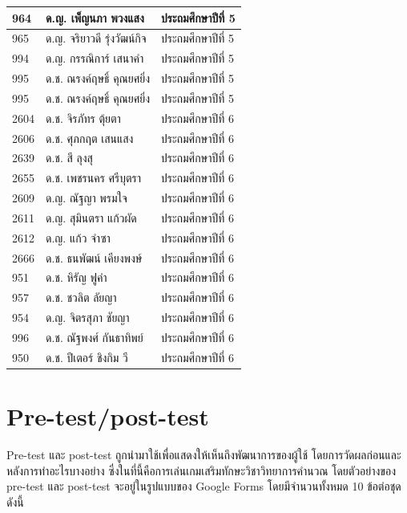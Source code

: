 \begin{center}
\begin{tabular}{ |p{3cm}|p{4cm}|p{3cm}| }
        964 & ด.ญ. เพ็ญนภา พวงแสง & ประถมศึกษาปีที่ 5\\
        \hline
        965 & ด.ญ. จริยาวดี รุ่งวัฒน์กิจ & ประถมศึกษาปีที่ 5\\
        \hline
        994 & ด.ญ. กรรณิการ์ เสนาคำ & ประถมศึกษาปีที่ 5\\
        \hline
        995 & ด.ช. ณรงค์ฤษธิ์ คุณยศยิ่ง & ประถมศึกษาปีที่ 5\\
        \hline
        995 & ด.ช. ณรงค์ฤษธิ์ คุณยศยิ่ง & ประถมศึกษาปีที่ 5\\
        \hline
        2604 & ด.ช. จิรภัทร ตุ้ยตา & ประถมศึกษาปีที่ 6\\
        \hline
        2606 & ด.ช. ศุภกฤต เสนแสง & ประถมศึกษาปีที่ 6\\
        \hline
        2639 & ด.ช. สี ลุงสุ & ประถมศึกษาปีที่ 6\\
        \hline
        2655 & ด.ช. เพชรนคร ศรีบุตรา & ประถมศึกษาปีที่ 6\\
        \hline
        2609 & ด.ญ. ณัฐญา พรมใจ & ประถมศึกษาปีที่ 6\\
        \hline
        2611 & ด.ญ. สุมินตรา แก้วผัด & ประถมศึกษาปีที่ 6\\
        \hline
        2612 & ด.ญ. แก้ว จำซา & ประถมศึกษาปีที่ 6\\
        \hline
        2666 & ด.ช. ธนพัฒน์ เคียงพงษ์ & ประถมศึกษาปีที่ 6\\
        \hline
        951 & ด.ช. หิรัญ ฟูคำ & ประถมศึกษาปีที่ 6\\
        \hline
        957 & ด.ช. ชวลิต ลัยญา & ประถมศึกษาปีที่ 6\\
        \hline
        954 & ด.ญ. จิตรสุภา ชัยญา & ประถมศึกษาปีที่ 6\\
        \hline
        996 & ด.ช. ณัฐพงศ์ กันธาทิพย์ & ประถมศึกษาปีที่ 6\\
        \hline
        950 & ด.ช. ปีเตอร์ ชิงกิม วี & ประถมศึกษาปีที่ 6\\
        \hline
    \end{tabular}
\end{center}

\chapter{Pre-test/post-test}
Pre-test และ post-test ถูกนำมาใช้เพื่อแสดงให้เห็นถึงพัฒนาการของผู้ใช้ โดยการวัดผลก่อนและหลังการทำอะไรบางอย่าง ซึ่งในที่นี้คือการเล่นเกมเสริมทักษะวิชาวิทยาการคำนวณ
โดยตัวอย่างของ pre-test และ post-test จะอยู่ในรูปแบบของ Google Forms โดยมีจำนวนทั้งหมด 10 ข้อต่อชุด ดังนี้
